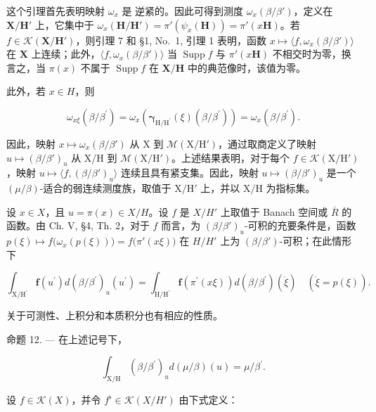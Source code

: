 这个引理首先表明映射 \(\omega_x\) 是 逆紧的。因此可得到测度 \(\omega_x(\beta/\beta')\)，定义在 \(\mathbf{X}/\mathbf{H}'\) 上，它集中于 \(\omega_x(\mathbf{H}/\mathbf{H}') = \pi'(\psi_x(\mathbf{H})) = \pi'(x\mathbf{H})\)。若 \(f \in \mathcal{K}(\mathbf{X}/\mathbf{H}')\)，则引理 7 和 §1, No.~1, 引理 1 表明，函数 \(x \mapsto \langle f, \omega_x(\beta/\beta') \rangle\) 在 \(\mathbf{X}\) 上连续；此外，\(\langle f, \omega_x(\beta/\beta') \rangle\) 当 \(\operatorname{Supp} f\) 与 \(\pi'(x\mathbf{H})\) 不相交时为零，换言之，当 \(\pi(x)\) 不属于 \(\operatorname{Supp} f\) 在 \(\mathbf{X}/\mathbf{H}\) 中的典范像时，该值为零。

此外，若 \(x \in H\)，则

\[
\omega_ {x \xi} (\beta / \beta^ {\prime}) = \omega_ {x} \left(\boldsymbol {\gamma} _ {\mathrm{H} / \mathrm{H} ^ {\prime}} (\xi) (\beta / \beta^ {\prime})\right) = \omega_ {x} (\beta / \beta^ {\prime}).
\]

因此，映射 \(x \mapsto \omega_x(\beta/\beta')\) 从 X 到 \(\mathcal{M}(\mathrm{X}/\mathrm{H}')\)，通过取商定义了映射 \(u \mapsto (\beta/\beta')_u\) 从 X/H 到 \(\mathcal{M}(\mathrm{X}/\mathrm{H}')\)。上述结果表明，对于每个 \(f \in \mathcal{K}(\mathrm{X}/\mathrm{H}')\)，映射 \(u \mapsto \langle f, (\beta/\beta')_u \rangle\) 连续且具有紧支集。因此，映射 \(u \mapsto (\beta/\beta')_u\) 是一个 \((\mu/\beta)\)-适合的弱连续测度族，取值于 \(\mathrm{X}/\mathrm{H}'\) 上，并以 \(\mathrm{X}/\mathrm{H}\) 为指标集。

设 \(x \in X\)，且 \(u = \pi(x) \in X/H\)。设 \(f\) 是 \(X/H'\) 上取值于 Banach 空间或 \(\overline{R}\) 的函数。由 Ch. V, §4, Th. 2，对于 \(f\) 而言，为 \((\beta/\beta')_u\)-可积的充要条件是，函数 \(p(\xi) \mapsto f\big(\omega_x(p(\xi))\big) = f\big(\pi'(x\xi)\big)\) 在 \(H/H'\) 上为 \((\beta/\beta')\)-可积；在此情形下

\[
\int_ {\mathrm{X} / \mathrm{H} ^ {\prime}} \mathbf {f} (u ^ {\prime}) d (\beta / \beta^ {\prime}) _ {u} (u ^ {\prime}) = \int_ {\mathrm{H} / \mathrm{H} ^ {\prime}} \mathbf {f} \left(\pi^ {\prime} (x \xi)\right) d (\beta / \beta^ {\prime}) (\dot {\xi}) \quad \left(\dot {\xi} = p (\xi)\right).\tag{21}
\]

关于可测性、上积分和本质积分也有相应的性质。

命题 12. --- 在上述记号下，

\[
\int_ {\mathrm{X/H}} (\beta / \beta^ {\prime}) _ {u} d (\mu / \beta) (u) = \mu / \beta^ {\prime}.\tag{22}
\]

设 \(f \in \mathcal{K}(X)\)，并令 \(f^{\flat} \in \mathcal{K}(X/H')\) 由下式定义：


